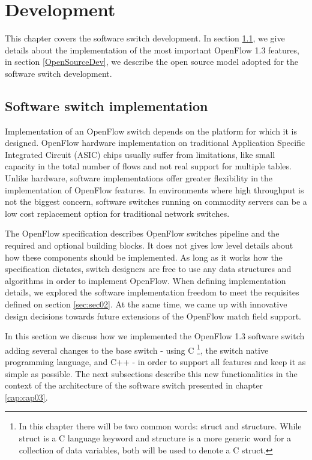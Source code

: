 \chapter{Development}
\label{cap:cap04}

This chapter covers the software switch development. In section \ref{softfeatures}, we give details about the implementation of the most important OpenFlow 1.3 features, in section \ref{OpenSourceDev}, we describe the open source model adopted for the software switch development. 

\section{Software switch implementation}
\label{softfeatures}

Implementation of an OpenFlow switch depends on the platform for which it is designed. OpenFlow hardware implementation on traditional Application Specific Integrated Circuit (ASIC) chips usually suffer from limitations, like small capacity in the total number of flows and not real support for multiple tables. Unlike hardware, software implementations offer greater flexibility in the implementation of OpenFlow features. In environments where high throughput is not the biggest concern, software switches running on commodity servers can be a low cost replacement option for traditional network switches.

The OpenFlow specification describes OpenFlow switches pipeline and the required and optional building blocks. It does not gives low level details about how these components should be implemented. As long as it works how the specification dictates, switch designers are free to use any data structures and algorithms in order to implement OpenFlow. When defining implementation details, we explored the software implementation freedom to meet the requisites defined on section \ref{sec:sec02}. At the same time, we came up with innovative design decisions towards future extensions of the OpenFlow match field support.  

In this section we discuss how we implemented the OpenFlow 1.3 software switch adding several changes to the base switch - using C \footnote{In this chapter there will be two common words: struct and structure. While struct is a C language keyword and structure is a more generic word for a collection of data variables, both will be used to denote a C struct.}, the switch native programming language, and C++ - in order to support all features and keep it as simple as possible. The next subsections describe this new functionalities in the context of the architecture of the software switch presented in chapter \ref{cap:cap03}.

